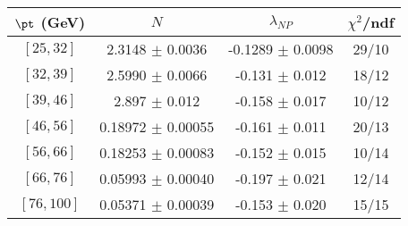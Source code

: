 \begin{tabular}{c||c|c|c}
$\pt$ (GeV) & $N$ & $\lambda_{NP}$ & $\chi^2$/ndf  \\
\hline
$[25, 32]$ & 2.3148 $\pm$ 0.0036 & -0.1289 $\pm$ 0.0098 & 29/10\\
$[32, 39]$ & 2.5990 $\pm$ 0.0066 & -0.131 $\pm$ 0.012 & 18/12\\
$[39, 46]$ & 2.897 $\pm$ 0.012 & -0.158 $\pm$ 0.017 & 10/12\\
$[46, 56]$ & 0.18972 $\pm$ 0.00055 & -0.161 $\pm$ 0.011 & 20/13\\
$[56, 66]$ & 0.18253 $\pm$ 0.00083 & -0.152 $\pm$ 0.015 & 10/14\\
$[66, 76]$ & 0.05993 $\pm$ 0.00040 & -0.197 $\pm$ 0.021 & 12/14\\
$[76, 100]$ & 0.05371 $\pm$ 0.00039 & -0.153 $\pm$ 0.020 & 15/15\\
\end{tabular}
